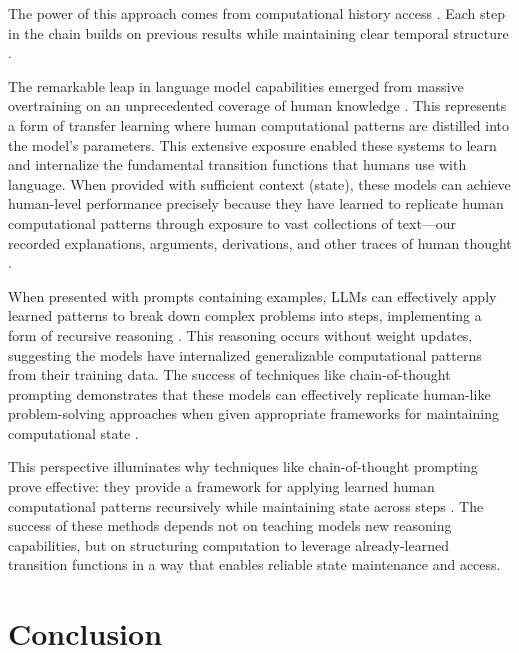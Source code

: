 \documentclass[12pt]{article}
\begin{document}
The power of this approach comes from computational history access \cite{fu2024memory}.
Each step in the chain builds on previous results while maintaining clear temporal structure \cite{wei2022chain}.

The remarkable leap in language model capabilities emerged from massive overtraining on an unprecedented coverage of human knowledge \cite{schuurmans2024autoregressive}.
This represents a form of transfer learning where human computational patterns are distilled into the model's parameters.
This extensive exposure enabled these systems to learn and internalize the fundamental transition functions that humans use with language.
When provided with sufficient context (state), these models can achieve human-level performance precisely because they have learned to replicate human computational patterns through exposure to vast collections of text---our recorded explanations, arguments, derivations, and other traces of human thought \cite{brown2020language,wei2022chain}.

When presented with prompts containing examples, LLMs can effectively apply learned patterns to break down complex problems into steps, implementing a form of recursive reasoning \cite{wei2022chain}.
This reasoning occurs without weight updates, suggesting the models have internalized generalizable computational patterns from their training data.
The success of techniques like chain-of-thought prompting demonstrates that these models can effectively replicate human-like problem-solving approaches when given appropriate frameworks for maintaining computational state \cite{wei2022emergent}.

This perspective illuminates why techniques like chain-of-thought prompting prove effective: they provide a framework for applying learned human computational patterns recursively while maintaining state across steps \cite{wei2022chain}.
The success of these methods depends not on teaching models new reasoning capabilities, but on structuring computation to leverage already-learned transition functions in a way that enables reliable state maintenance and access.


\section{Conclusion}
\end{document}
